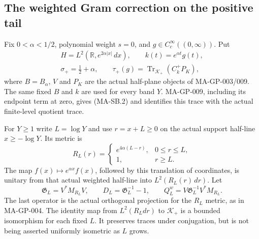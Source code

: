 \subsection{The weighted Gram correction on the positive tail}

Fix $0<\alpha<1/2$, polynomial weight $s=0$, and
$g\in C_c^\infty((0,\infty))$.
Put
\[
 \begin{gathered}
 H=L^2(\mathbb R,e^{2\alpha|x|}\,dx),\qquad
 k(t)=e^{\alpha t}g(t),\\
 \sigma_+=\tfrac12+\alpha,\qquad
 \tau_+(g)=\operatorname{Tr}_{\mathcal K_+}(C_k^+P_K),
 \end{gathered}
 \tag{MA-SB.9}
\]
where $B=B_\alpha$, $V$ and $P_K$ are the actual
half-plane objects of MA-GP-003/009.
The same fixed $B$ and $k$ are used for every band $Y$.
MA-GP-009, including its endpoint term at zero, gives
(MA-SB.2) and identifies this trace with the actual
finite-level quotient trace.

For $Y\ge1$ write $L=\log Y$ and use $r=x+L\ge0$ on
the actual support half-line $x\ge-\log Y$.
Its metric is
\[
 R_L(r)=
 \begin{cases}
 e^{4\alpha(L-r)},&0\le r\le L,\\
 1,&r\ge L.
 \end{cases}
 \tag{MA-SB.10}
\]
The map $f(x)\mapsto e^{\alpha x}f(x)$, followed by this
translation of coordinates, is unitary from that actual
weighted half-line into $L^2(R_L(r)\,dr)$.
Let
\[
 \mathfrak G_L=V^*M_{R_L}V,\qquad
 D_L=\mathfrak G_L^{-1}-1,\qquad
 Q_L^w=V\mathfrak G_L^{-1}V^*M_{R_L}.
 \tag{MA-SB.11}
\]
The last operator is the actual orthogonal projection
for the $R_L$ metric, as in MA-GP-004.
The identity map from $L^2(R_Ldr)$ to $\mathcal K_+$
is a bounded isomorphism for each fixed $L$.
It preserves traces under conjugation, but is not
being asserted uniformly isometric as $L$ grows.

